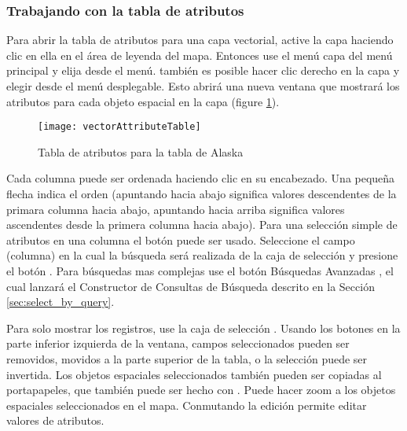 \subsubsection{Trabajando con la tabla de atributos}\label{sec:attribute table}

Para abrir la tabla de atributos para una capa vectorial, active la capa haciendo clic en ella en el \'area de leyenda del mapa. 
Entonces use el men\'u  capa del men\'u principal y elija  
desde el men\'u. también es posible hacer clic derecho en la capa y elegir  
desde el men\'u desplegable. Esto abrir\'a una nueva ventana que mostrar\'a los atributos para cada objeto espacial en la capa 
(figure \ref{fig:attributetable}).

\begin{figure}[ht]
   \begin{center}
   \caption{Tabla de atributos para la tabla de Alaska \nixcaption}\label{fig:attributetable}\smallskip
   \texttt{[image: vectorAttributeTable]}
\end{center} 
\end{figure}

Cada columna puede ser ordenada haciendo clic en su encabezado. Una peque\~na flecha indica el orden 
(apuntando hacia abajo significa valores descendentes de la primara columna hacia abajo, apuntando hacia arriba significa valores ascendentes desde la primera columna hacia abajo). 
Para una selecci\'on simple de atributos en una columna el bot\'on  
puede ser usado. Seleccione el campo (columna) en la cual la b\'usqueda ser\'a realizada 
de la caja de selecci\'on y presione el bot\'on . Para b\'usquedas mas complejas use
el bot\'on B\'usquedas Avanzadas , el cual lanzar\'a el Constructor de Consultas de B\'usqueda descrito en 
la Secci\'on \ref{sec:select_by_query}. 

Para solo mostrar los registros, use la caja de selecci\'on .
Usando los botones en la parte inferior izquierda  de la ventana, campos seleccionados pueden ser removidos, 
movidos a la parte superior de la tabla, o la selecci\'on puede ser invertida. Los objetos espaciales seleccionados también pueden ser
copiadas al portapapeles, que también puede ser hecho con . Puede hacer zoom 
a los objetos espaciales seleccionados en el mapa. Conmutando la edici\'on permite editar valores de atributos. 

